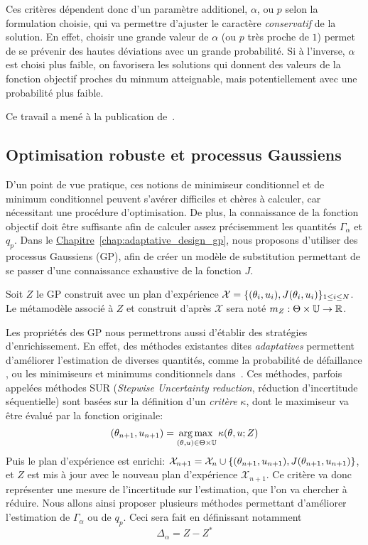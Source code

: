 \documentclass[../../Main_ManuscritThese.tex]{subfiles}
\newcommand{\frchap}[1]{\hyperref[#1]{Chapitre}~\ref{#1}}
\begin{document}
Ces critères dépendent donc d'un paramètre additionel, $\alpha$, ou
$p$ selon la formulation choisie, qui va permettre d'ajuster le
caractère \emph{conservatif} de la solution. En effet, choisir une
grande valeur de $\alpha$ (ou $p$ très proche de $1$) permet de se
prévenir des hautes déviations avec un grande probabilité. Si à
l'inverse, $\alpha$ est choisi plus faible, on favorisera les
solutions qui donnent des valeurs de la fonction objectif proches du
minmum atteignable, mais potentiellement avec une probabilité plus
faible.
  
Ce travail a mené à la publication de~\cite{trappler_robust_2020}.
  
\subsection*{Optimisation robuste et processus Gaussiens}
D'un point de vue pratique, ces notions de minimiseur conditionnel et
de minimum conditionnel peuvent s'avérer difficiles et chères à
calculer, car nécessitant une procédure d'optimisation. De plus, la
connaissance de la fonction objectif doit être suffisante afin de
calculer assez précisemment les quantités $\Gamma_{\alpha}$ et $q_p$.
Dans le \frchap{chap:adaptative_design_gp}, nous proposons d'utiliser
des processus Gaussiens (GP), afin de créer un modèle de substitution
permettant de se passer d'une connaissance exhaustive de la fonction
$J$.

Soit $Z$ le GP construit avec un plan d'expérience
$\mathcal{X}=\{(\theta_i, u_i), J(\theta_i, u_i)\}_{1\leq i \leq N}$. Le
métamodèle associé à $Z$ et construit d'après $\mathcal{X}$ sera noté
$m_Z:\Theta\times \mathbb{U} \rightarrow \mathbb{R}$.

Les propriétés des GP nous permettrons aussi d'établir des stratégies
d'enrichissement. En effet, des méthodes existantes dites
\emph{adaptatives} permettent d'améliorer l'estimation de diverses
quantités, comme la probabilité de défaillance
\cite{razaaly_rare_2019,moustapha_quantile-based_2016,bect_sequential_2012},
ou les minimiseurs et minimums conditionnels
dans~\cite{ginsbourger_bayesian_2014}. Ces méthodes, parfois appelées
méthodes SUR (\emph{Stepwise Uncertainty reduction}, réduction
d'incertitude séquentielle) sont basées sur la définition d'un
\emph{critère} $\kappa$, dont le maximiseur va être évalué par la fonction
originale:
\begin{equation}
  (\theta_{n+1}, u_{n+1}) = \operatorname*{arg\,max \,}_{(\theta,u) \in \Theta\times\mathbb{U}} \kappa(\theta, u; Z)
\end{equation}
Puis le plan d'expérience est enrichi:
$\mathcal{X}_{n+1} = \mathcal{X}_n \cup \{(\theta_{n+1}, u_{n+1}),
J(\theta_{n+1}, u_{n+1})\}$, et $Z$ est mis à jour avec le nouveau plan
d'expérience $\mathcal{X}_{n+1}$.  Ce critère va donc représenter une
mesure de l'incertitude sur l'estimation, que l'on va chercher à
réduire. Nous allons ainsi proposer plusieurs méthodes permettant
d'améliorer l'estimation de $\Gamma_{\alpha}$ ou de $q_p$. Ceci sera fait en définissant notamment
\begin{equation}
  \Delta_{\alpha} = Z - Z^*
\end{equation}
\end{document}

